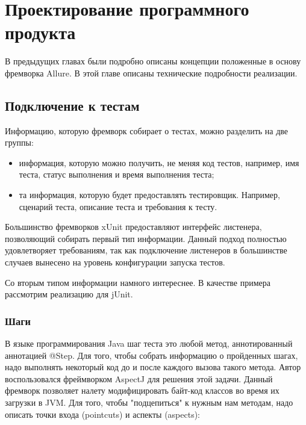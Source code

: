 \chapter{Проектирование программного продукта} 
\label{chapter3}

В предыдущих главах были подробно описаны концепции положенные в основу фремворка Allure. В этой главе
описаны технические подробности реализации.

\section{Подключение к тестам}

Информацию, которую фремворк собирает о тестах, можно разделить на две группы:

\begin{itemize}
\item информация, которую можно получить, не меняя код тестов, например, имя теста, статус выполнения и время выполнения теста;
\item та информация, которую будет предоставлять тестировщик. Например, сценарий теста, описание теста и требования к тесту.
\end{itemize}

Большинство фремворков xUnit предоставляют интерфейс листенера, позволяющий собирать первый тип информации. Данный подход полностью удовлетворяет требованиям, так как подключение листенеров в большинстве случаев вынесено на уровень конфигурации запуска тестов.

Со вторым типом информации намного интереснее. В качестве примера рассмотрим реализацию для jUnit.

\subsection{Шаги}

В языке программирования Java шаг теста это любой метод, аннотированный аннотацией @Step. Для того, чтобы собрать информацию о пройденных шагах, надо выполнять некоторый код до и после каждого вызова такого метода. Автор воспользовался фреймворком AspectJ для решения этой задачи. Данный фремворк позволяет налету модифицировать байт-код классов во время их загрузки в JVM. Для того, чтобы "подцепиться" к нужным нам методам, надо описать точки входа (pointcuts) и аспекты (aspects): 

